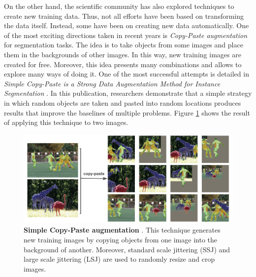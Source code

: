 On the other hand, the scientific community has also explored techniques to create new training data. Thus, not all efforts have been based on transforming the data itself. Instead, some have been on creating new data automatically. One of the most exciting directions taken in recent years is \textit{Copy-Paste augmentation} for segmentation tasks. The idea is to take objects from some images and place them in the backgrounds of other images. In this way, new training images are created for free. Moreover, this idea presents many combinations and allows to explore many ways of doing it. One of the most successful attempts is detailed in \textit{Simple Copy-Paste is a Strong Data Augmentation Method for Instance Segmentation} \cite{ghiasi2021simple}. In this publication, researchers demonstrate that a simple strategy in which random objects are taken and pasted into random locations produces results that improve the baselines of multiple problems. Figure \ref{fig:copy-paste} shows the result of applying this technique to two images.

\begin{figure}
    \centering
    \includegraphics[width=1\textwidth]{Pictures/copy-paste.png} 
    \caption{\textbf{Simple Copy-Paste augmentation} \cite{ghiasi2021simple}. This technique generates new training images by copying objects from one image into the background of another. Moreover, standard scale jittering (SSJ) and large scale jittering (LSJ) are used to randomly resize and crop images.}
    \label{fig:copy-paste}
\end{figure}

